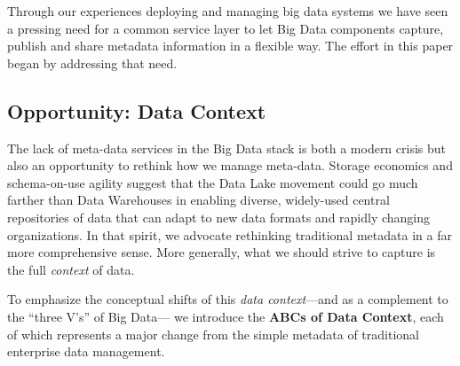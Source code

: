 \documentclass{sig-alternate}
\begin{document}

Through our experiences deploying and managing big data systems we 
have seen a pressing need for a common service layer to let Big Data components capture, publish and share metadata information in a flexible way. 
The effort in this paper began by addressing that need.

\subsection{Opportunity: Data Context}
The lack of meta-data services in the Big Data stack is both a modern crisis
but also an 
opportunity to rethink how we manage meta-data.
Storage economics and schema-on-use agility suggest that the Data Lake movement could go much farther than Data Warehouses in enabling diverse, widely-used central repositories of data that can adapt to new data formats and rapidly changing organizations.
In that spirit, we advocate rethinking traditional metadata in a far more comprehensive sense. 
More generally, what we should strive to capture is the full \emph{context} of data.

To emphasize the conceptual shifts of this \emph{data context}---and as a complement to the ``three V's'' of Big Data---
we introduce the \textbf{ABCs of Data Context}, each of which represents a major change from the simple metadata of traditional enterprise data management.


\end{document}
